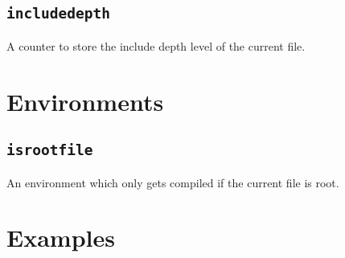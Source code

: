 \documentclass{article}
\begin{document}
\subsection{\texttt{includedepth}}\label{sec:counters:includedepth}
    A counter to store the include depth level of the current file.

\section{Environments}
\subsection{\texttt{isrootfile}}\label{sec:environments:isrootfile}
    An environment which only gets compiled if the current file is root.

\section{Examples}
\end{document}
